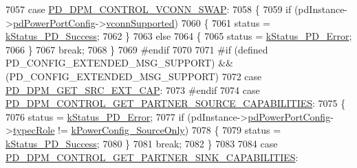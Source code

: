\begin{DoxyCode}
{}
7057 \textcolor{preprocessor}{}        \textcolor{keywordflow}{case} \hyperlink{group__usb__pd__stack_ggabf2676c3360b7c572954ae09c0a5e46aa9be0b6c27f6eb87d6466b9697915f460}{PD\_DPM\_CONTROL\_VCONN\_SWAP}:
7058         \{
7059             \textcolor{keywordflow}{if} (pdInstance->\hyperlink{struct__pd__instance_aa7854ddf70e64f92b178cc5d787037a2}{pdPowerPortConfig}->\hyperlink{struct__pd__power__port__config_aa552a27c5747ea789ad185fefac44194}{vconnSupported})
7060             \{
7061                 status = \hyperlink{group__usb__pd__stack_ggaaad4cd00dd02567c6169429e3a895073acf06f954f9c52f560cea34df48c63555}{kStatus\_PD\_Success};
7062             \}
7063             \textcolor{keywordflow}{else}
7064             \{
7065                 status = \hyperlink{group__usb__pd__stack_ggaaad4cd00dd02567c6169429e3a895073a4d58370b8ee8d3d2a4c477f7a3f84dda}{kStatus\_PD\_Error};
7066             \}
7067             \textcolor{keywordflow}{break};
7068         \}
7069 \textcolor{preprocessor}{#endif
}
7070 \textcolor{preprocessor}{}
7071 \textcolor{preprocessor}{#if (defined PD\_CONFIG\_EXTENDED\_MSG\_SUPPORT) && (PD\_CONFIG\_EXTENDED\_MSG\_SUPPORT)
}
7072 \textcolor{preprocessor}{}        \textcolor{keywordflow}{case} \hyperlink{group__usb__pd__stack_ggabf2676c3360b7c572954ae09c0a5e46aa878ef19e6ac385bd02876ceb23629865}{PD\_DPM\_GET\_SRC\_EXT\_CAP}:
7073 \textcolor{preprocessor}{#endif
}
7074 \textcolor{preprocessor}{}        \textcolor{keywordflow}{case} \hyperlink{group__usb__pd__stack_ggabf2676c3360b7c572954ae09c0a5e46aae21522a20dc98bf1e6a27fd41104158a}{PD\_DPM\_CONTROL\_GET\_PARTNER\_SOURCE\_CAPABILITIES}:
7075         \{
7076             status = \hyperlink{group__usb__pd__stack_ggaaad4cd00dd02567c6169429e3a895073a4d58370b8ee8d3d2a4c477f7a3f84dda}{kStatus\_PD\_Error};
7077             \textcolor{keywordflow}{if} (pdInstance->\hyperlink{struct__pd__instance_aa7854ddf70e64f92b178cc5d787037a2}{pdPowerPortConfig}->\hyperlink{struct__pd__power__port__config_a649079672f270a65578bd41e0e624e16}{typecRole} != 
      \hyperlink{group__usb__pd__stack_ggaffef947540aace08ecf6fd25f69720a9a38da91c9c7115f0e6866a557601ad9b0}{kPowerConfig\_SourceOnly})
7078             \{
7079                 status = \hyperlink{group__usb__pd__stack_ggaaad4cd00dd02567c6169429e3a895073acf06f954f9c52f560cea34df48c63555}{kStatus\_PD\_Success};
7080             \}
7081             \textcolor{keywordflow}{break};
7082         \}
7083 
7084         \textcolor{keywordflow}{case} \hyperlink{group__usb__pd__stack_ggabf2676c3360b7c572954ae09c0a5e46aa4ea4864194875bf84ea3b2cf923a6f14}{PD\_DPM\_CONTROL\_GET\_PARTNER\_SINK\_CAPABILITIES}:

\end{DoxyCode}
